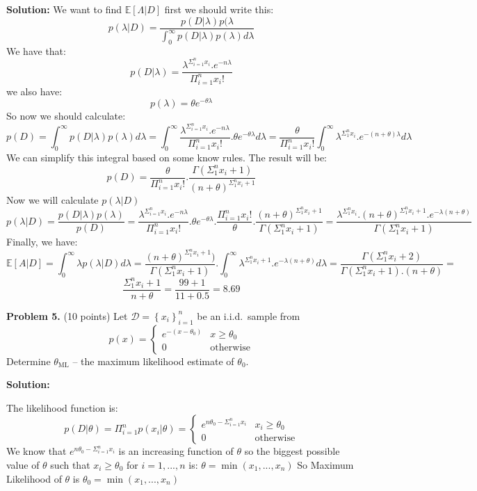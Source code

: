 \documentclass[twoside]{article}
\begin{document}
\begin{enumerate}
\textbf{Solution:}
We want to find $\mathbb{E}[\Lambda | D]$ first we should write this:
\[
p(\lambda|D) = \frac{p(D|\lambda)p(\lambda}{\int_0^\infty p(D|\lambda)p(\lambda)d\lambda}
\]
We have that:
\[
p(D|\lambda) = \frac{\lambda^{\Sigma_{i=1}^{n}{x_i}} . e^{-n\lambda}}{\Pi_{i=1}^{n}{x_i!}}
\]
we also have:
\[
p(\lambda) = \theta e^{-\theta \lambda}
\]
So now we should calculate:
\[
p(D) = \int_0^\infty{p(D|\lambda)p(\lambda)d\lambda} = \int_0^\infty{{\frac{\lambda^{\Sigma_{i=1}^{n}{x_i}} . e^{-n\lambda}}{\Pi_{i=1}^{n}{x_i!}}}.{\theta e^{-\theta \lambda}}d\lambda} =
\frac{\theta}{\Pi_{i=1}^n{x_i!}} \int_0^\infty{\lambda^{\Sigma_1^n{x_i}}.e^{-(n+\theta)\lambda}d\lambda}
\]
We can simplify this integral based on some know rules. The result will be:
\[
p(D) = \frac{\theta}{\Pi_{i=1}^n{x_i!}} .
\frac{\Gamma(\Sigma_1^n{x_i + 1})}{(n+\theta)^{\Sigma_1^n{x_i + 1}}}
\]
Now we will calculate $p(\lambda|D)$
\[
p(\lambda|D) = 
\frac{p(D|\lambda)p(\lambda)}{p(D)} =
{\frac{\lambda^{\Sigma_{i=1}^{n}{x_i}} . e^{-n\lambda}}{\Pi_{i=1}^{n}{x_i!}}}.{\theta e^{-\theta \lambda}} . 
\frac{\Pi_{i=1}^n{x_i!}}{\theta} .
\frac{(n+\theta)^{\Sigma_1^n{x_i + 1}}}{\Gamma(\Sigma_1^n{x_i + 1})} =
\frac{\lambda^{\Sigma_1^n{x_i}} . (n+\theta)^{\Sigma_1^n{x_i + 1}} . e^{-\lambda(n+\theta)} } {\Gamma(\Sigma_1^n{x_i} + 1)}
\]
Finally, we have:
\[
\mathbb{E}[A|D] = \int_0^\infty{\lambda p(\lambda|D)d\lambda} = 
\frac{(n+\theta)^{\Sigma_1^n{x_i} + 1})}{\Gamma(\Sigma_1^n{x_i}+1)} .
\int_0^\infty{\lambda^{\Sigma_1^n{x_i}+1} . e^{-\lambda(n+\theta)} d\lambda} =
\frac{\Gamma(\Sigma_1^n{x_i} + 2)}{\Gamma(\Sigma_1^n{x_i}+1).(n+\theta)} =
\]
\[
\frac{\Sigma_1^n{x_i}+1}{n+\theta} = \frac{99+1}{11+0.5} = 8.69
\]

\end{enumerate}


\textbf{Problem 5.} (10 points) Let $\mathcal{D}=\left\{ x_i\right\}_{i=1}^n$ be an i.i.d.~sample from
\[
p(x)=\begin{cases}
e^{-(x-\theta_0)} & x \geq \theta_0\\
0 & \textrm{otherwise}
\end{cases}
\]
\noindent Determine $\theta_{\textrm{ML}}$ -- the maximum likelihood estimate of $\theta_0$. 

\textbf{Solution:}

The likelihood function is:
\[
p(D|\theta) = \Pi_{i=1}^n{p(x_i|\theta)} = 
\begin{cases}
e^{n \theta_0 - \Sigma_{i=1}^n{x_i}} & x_i \geq \theta_0\\
0 & \textrm{otherwise}
\end{cases}
\]
We know that $e^{n \theta_0 - \Sigma_{i=1}^n{x_i}}$ is an increasing function of $\theta$ so the biggest possible value of $\theta$ such that $x_i \geq \theta_0$ for $i=1,...,n$ is: $\theta = \min(x_1,...,x_n)$ 
So Maximum Likelihood of $\theta$ is $\theta_0 = \min(x_1,...,x_n)$
\end{document}
